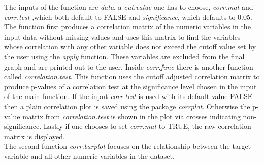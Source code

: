 The inputs of the function are \textit{data}, a \textit{cut.value} one has to choose, \textit{corr.mat} and \textit{corr.test} ,which both default to FALSE and \textit{significance}, which defaults to 0.05. The function first produces a correlation matrix of the numeric variables in the input data without missing values and uses this matrix to find the variables whose correlation with any other variable does not exceed the cutoff value set by the user using the \textit{apply} function. These variables are excluded from the final graph and are printed out to the user. Inside \textit{corr.func} there is another function called \textit{correlation.test}. This function uses the cutoff adjusted correlation matrix to produce p-values of a correlation test at the significance level chosen in the input of the main function. If the input \textit{corr.test} is used with its default value FALSE then a plain correlation plot is saved using the package \textit{corrplot}. Otherwise the p-value matrix from \textit{correlation.test} is shown in the plot via crosses indicating non-significance. Lastly if one chooses to set \textit{corr.mat} to TRUE, the raw correlation matrix is displayed. \\
The second function \textit{corr.barplot} focuses on the relationship between the target variable and all other numeric variables in the dataset. 
